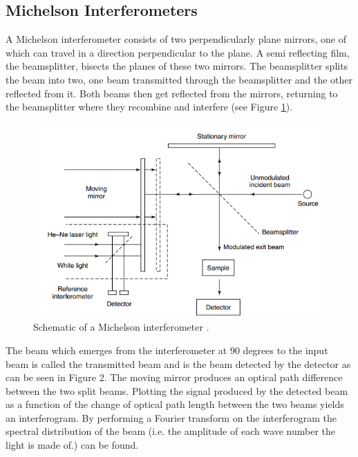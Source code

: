 \documentclass[reprint,amsmath,amssymb,aps, prl,superscriptaddress]{revtex4-2}
\begin{document}
\subsection{Michelson Interferometers}
A Michelson interferometer consists of two perpendicularly plane mirrors, one of which can travel in a direction perpendicular to the plane.
A semi reflecting film, the beamsplitter, bisects the planes of these two mirrors. The beamsplitter splits the beam into two, one beam transmitted through the beamsplitter and the other reflected from it. Both beams then get reflected from the mirrors, returning to the beamsplitter where they recombine and interfere \cite{stuart} (see Figure \ref{fig:Interferometer}). 
\begin{figure}[H]
    \includegraphics[width=\linewidth]{Images/INTERFEROMETER.png}
    \caption{Schematic of a Michelson interferometer \cite{stuart}.}
    \label{fig:Interferometer}
    \centering
\end{figure}
The beam which emerges from the interferometer at 90 degrees to the input beam is called the transmitted beam and is the beam detected by the detector as can be seen in Figure 2.
The moving mirror produces an optical path difference between the two split beams.
Plotting the signal produced by the detected beam
as a function of the change of
optical path length between the two beams yields
an interferogram. By performing a Fourier transform on the interferogram the spectral distribution of the beam (i.e. the amplitude of each wave number the light is made of.)
can be found.
\end{document}

